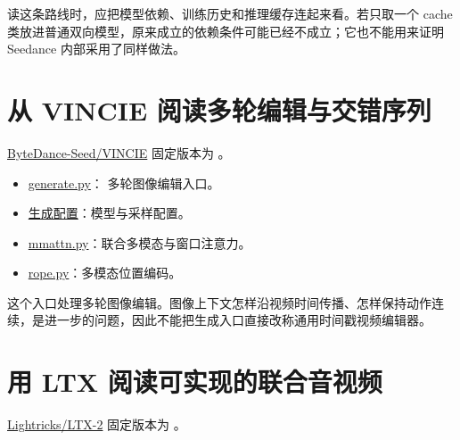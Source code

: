 读这条路线时，应把模型依赖、训练历史和推理缓存连起来看。若只取一个 cache 类放进普通双向模型，原来成立的依赖条件可能已经不成立；它也不能用来证明 Seedance 内部采用了同样做法。

\section{从 VINCIE 阅读多轮编辑与交错序列}\label{seedance-m15-ux4ece-vincie-ux9605ux8bfbux591aux8f6eux7f16ux8f91ux4e0eux4ea4ux9519ux5e8fux5217}

\href{https://github.com/ByteDance-Seed/VINCIE}{ByteDance-Seed/VINCIE} 固定版本为 。

\begin{itemize}
\tightlist
\item
  \href{https://github.com/ByteDance-Seed/VINCIE/blob/97cd2c5701e694dabcfea320c0cf59893d427fab/generate.py}{generate.py}： 多轮图像编辑入口。
\item
  \href{https://github.com/ByteDance-Seed/VINCIE/blob/97cd2c5701e694dabcfea320c0cf59893d427fab/configs/generate.yaml}{生成配置}：模型与采样配置。
\item
  \href{https://github.com/ByteDance-Seed/VINCIE/blob/97cd2c5701e694dabcfea320c0cf59893d427fab/models/dit/blocks/attention/mmattn.py}{mmattn.py}：联合多模态与窗口注意力。
\item
  \href{https://github.com/ByteDance-Seed/VINCIE/blob/97cd2c5701e694dabcfea320c0cf59893d427fab/models/dit/rope.py}{rope.py}：多模态位置编码。
\end{itemize}

这个入口处理多轮图像编辑。图像上下文怎样沿视频时间传播、怎样保持动作连续，是进一步的问题，因此不能把生成入口直接改称通用时间戳视频编辑器。

\section{用 LTX 阅读可实现的联合音视频}\label{seedance-m15-ux7528-ltx-ux9605ux8bfbux53efux5b9eux73b0ux7684ux8054ux5408ux97f3ux89c6ux9891}

\href{https://github.com/Lightricks/LTX-2}{Lightricks/LTX-2} 固定版本为 。

